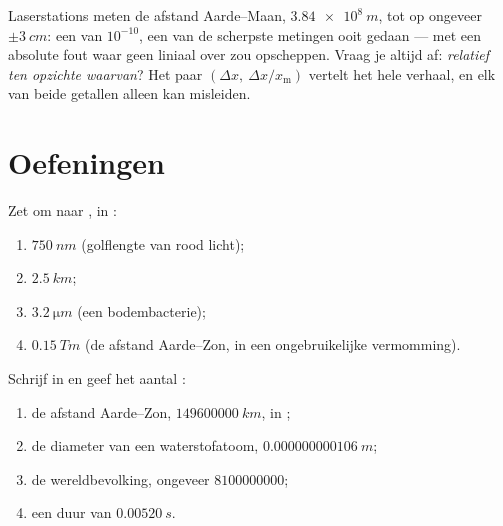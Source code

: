 \begin{remark}\label{rem:g10:orders-of-magnitude:precision}
Laserstations meten de afstand Aarde--Maan, $\qty{3.84e8}{m}$, tot op
ongeveer $\pm\qty{3}{cm}$: een  van $10^{-10}$,
een van de scherpste metingen ooit gedaan --- met een absolute fout
waar geen liniaal over zou opscheppen. Vraag je altijd af:
\emph{relatief ten opzichte waarvan}? Het paar
$(\Delta x,\ \Delta x / x_{\text{m}})$ vertelt het hele verhaal, en
elk van beide getallen alleen kan misleiden.
\end{remark}

\section{Oefeningen}

\begin{exercise}[$\star$]\label{exo:g10:orders-of-magnitude:1}
Zet om naar , in :
\begin{enumerate}
  \item $\qty{750}{nm}$ (golflengte van rood licht);
  \item $\qty{2.5}{km}$;
  \item $\qty{3.2}{\micro m}$ (een bodembacterie);
  \item $\qty{0.15}{Tm}$ (de afstand Aarde--Zon, in een ongebruikelijke
        vermomming).
\end{enumerate}
\end{exercise}

\begin{exercise}[$\star$]\label{exo:g10:orders-of-magnitude:2}
Schrijf in  en geef het aantal :
\begin{enumerate}
  \item de afstand Aarde--Zon, $\qty{149600000}{km}$, in ;
  \item de diameter van een waterstofatoom, $\qty{0.000000000106}{m}$;
  \item de wereldbevolking, ongeveer $\num{8100000000}$;
  \item een duur van $\qty{0.00520}{s}$.
\end{enumerate}
\end{exercise}

